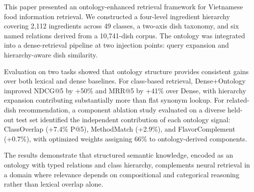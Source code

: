 \label{sec:conclusion}

This paper presented an ontology-enhanced retrieval framework for Vietnamese food information retrieval. We constructed a four-level ingredient hierarchy covering 2{,}112 ingredients across 49 classes, a two-axis dish taxonomy, and six named relations derived from a 10{,}741-dish corpus. The ontology was integrated into a dense-retrieval pipeline at two injection points: query expansion and hierarchy-aware dish similarity.

Evaluation on two tasks showed that ontology structure provides consistent gains over both lexical and dense baselines. For class-based retrieval, Dense+Ontology improved NDCG@5 by +50\% and MRR@5 by +41\% over Dense, with hierarchy expansion contributing substantially more than flat synonym lookup. For related-dish recommendation, a component ablation study evaluated on a diverse held-out test set identified the independent contribution of each ontology signal: ClassOverlap (+7.4\% P@5), MethodMatch (+2.9\%), and FlavorComplement (+0.7\%), with optimized weights assigning 66\% to ontology-derived components.

The results demonstrate that structured semantic knowledge, encoded as an ontology with typed relations and class hierarchy, complements neural retrieval in a domain where relevance depends on compositional and categorical reasoning rather than lexical overlap alone.
